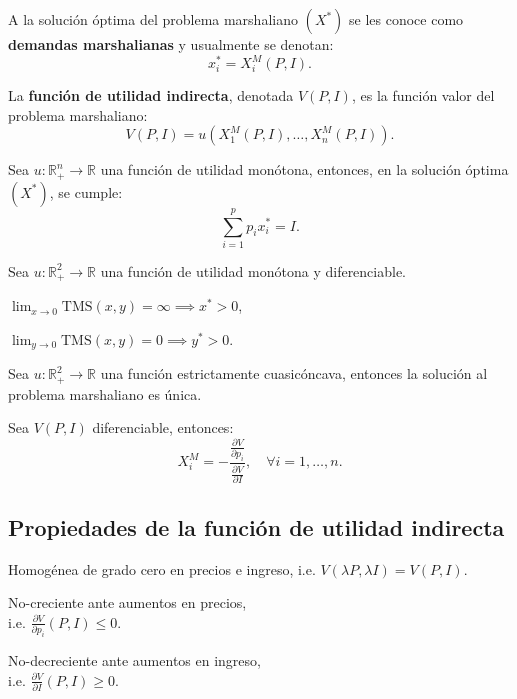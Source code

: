\documentclass[8pt,a4paper]{extarticle}
\begin{document}
\begin{multicols}{3}
\begin{boxdef}
A la solución óptima del problema marshaliano $(X^*)$ se les conoce como \textbf{demandas marshalianas} y usualmente se denotan:
\[
	x_i^* = X_i^M (P, I)
.\] 
\end{boxdef}

\begin{boxdef}
	La \textbf{función de utilidad indirecta}, denotada $V(P, I)$, es la función valor del problema marshaliano:
	\[
		V(P, I) = u(X_1^M(P, I), \ldots, X_n^M(P, I))
	.\] 
\end{boxdef}

\begin{boxtheo}
	Sea $u : \mathbb{R}^n_+ \to \mathbb{R}$ una función de utilidad monótona, entonces, en la solución óptima $(X^*)$, se cumple:
	\[
	\sum_{i=1}^{p} p_i x_i^* = I
	.\] 
\end{boxtheo}

\begin{boxtheo}
	Sea $u : \mathbb{R}^2_+ \to \mathbb{R}$ una función de utilidad monótona y diferenciable.
	\begin{eqlist}
	\item $\displaystyle \lim_{x \to 0} \text{TMS} (x, y) = \infty \implies x^* > 0$,
	\item $\displaystyle \lim_{y \to 0} \text{TMS} (x, y) = 0 \implies y^* > 0$.
	\end{eqlist}
\end{boxtheo}

\begin{boxtheo}
	Sea $u : \mathbb{R}^2_+ \to \mathbb{R}$ una función estrictamente cuasicóncava, entonces la solución al problema marshaliano es única.
\end{boxtheo}

\begin{boxlemma}
	Sea $V(P, I)$ diferenciable, entonces:
	\[
	X^M_i = - \frac{\displaystyle \frac{\partial V}{\partial p_{i}}}{ \displaystyle \frac{\partial V}{\partial I}}, \quad \forall i = 1, \ldots, n
	.\] 
\end{boxlemma}

\subsection{Propiedades de la función de utilidad indirecta}

\begin{eqlist}
\item Homogénea de grado cero en precios e ingreso, i.e. $V(\lambda P, \lambda I) = V(P, I)$.
\item No-creciente ante aumentos en precios, \\ i.e. $\displaystyle \frac{\partial V}{\partial p_i} (P, I) \leq 0$.
\item No-decreciente ante aumentos en ingreso, \\ i.e. $\displaystyle \frac{\partial V}{\partial I} (P, I) \geq 0$.
\end{eqlist}


\end{multicols}
\end{document}
